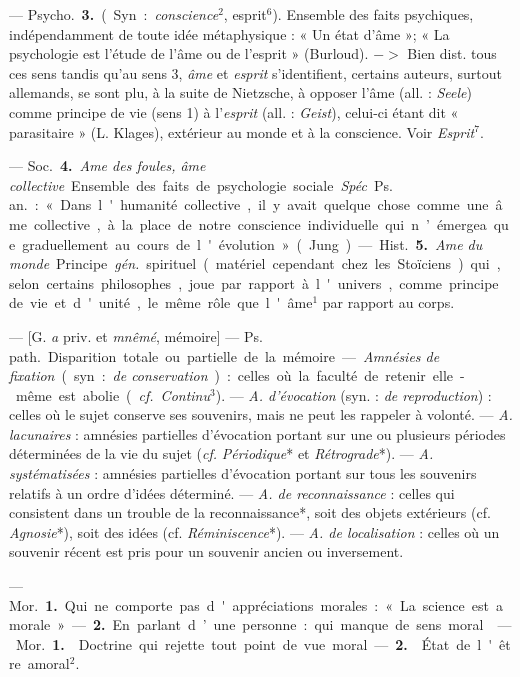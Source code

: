 \begin{itemize}[leftmargin=1cm, label=, itemsep=1pt]
{— \si{Psycho.} {\bf 3.} (Syn. : {\it conscience}$^2$,
esprit$^6$). Ensemble des faits psychiques, indépendamment de toute
idée métaphysique : « Un état
d'âme »; « La psychologie est l'étude
de l'âme ou de l'esprit » (Burloud).
$->$ Bien dist. tous ces sens
tandis qu'au sens 3, {\it âme} et {\it esprit}
s'identifient, certains auteurs, surtout allemands, se sont plu, à la suite
de Nietzsche, à opposer l’âme (all. :
{\it Seele}) comme principe de vie (sens 1)
à l'{\it esprit} (all. : {\it Geist}), celui-ci étant
dit « parasitaire » (L. Klages),
extérieur au monde et à la conscience. Voir {\it Esprit}$^7$.

— \si{Soc.} {\bf 4.} {\it Ame des foules, âme
collective}. Ensemble des faits de
psychologie sociale. {\it Spéc}. \si{Ps. an.} :
« Dans l'humanité collective, il y
avait quelque chose comme une âme
collective, à la place de notre conscience individuelle qui n’émergea
que graduellement au cours de
l'évolution » (Jung).

— \si{Hist.} {\bf 5.} {\it Ame du monde}. Principe  {\it gén.} spirituel (matériel
cependant chez les Stoïciens) qui, selon
certains philosophes, joue par rapport à l'univers, comme principe
de vie et d'unité, le même rôle que
l'âme$^1$ par rapport au corps.

 — [G. {\it a} priv. et {\it mnêmé}, mémoire] — \si{Ps. path.} Disparition
totale ou partielle de la mémoire.
— {\it Amnésies de fixation} (syn. : {\it de
conservation}) : celles où la faculté de
retenir elle-même est abolie ({\it cf.}  {\it Continu}$^3$).
— {\it A. d'évocation} (syn. : {\it de
reproduction}) : celles où le sujet conserve ses souvenirs, mais ne peut les
rappeler à volonté. — {\it A. lacunaires} :
amnésies partielles d’évocation portant sur une ou plusieurs périodes
déterminées de la vie du sujet ({\it cf.} 
{\it Périodique}* et {\it Rétrograde}*). — {\it A.
systématisées} : amnésies partielles
d'évocation portant sur tous les souvenirs relatifs à un ordre d'idées
déterminé. — {\it A. de reconnaissance} :
celles qui consistent dans un trouble
de la reconnaissance*, soit des objets
extérieurs (cf. {\it Agnosie}*), soit des
idées (cf. {\it Réminiscence}*). — {\it A. de
localisation} : celles où un souvenir
récent est pris pour un souvenir
ancien ou inversement.

 — \si{Mor.} {\bf 1.} Qui ne comporte
pas d'appréciations morales : « La
science est amorale ». — {\bf 2.} En parlant d’une personne : qui manque
de sens moral.

 — \si{Mor.} {\bf 1.}  Doctrine qui
rejette tout point de vue moral. —
 {\bf 2.}  État de l'être amoral$^2$.

}
\end{itemize}
